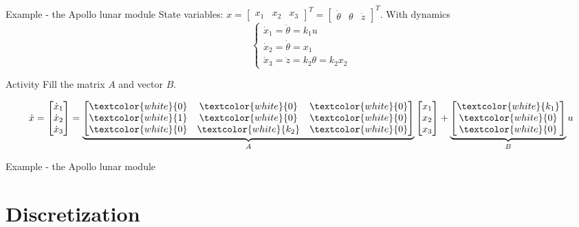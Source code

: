 \documentclass[presentation,aspectratio=1610]{beamer}
\begin{document}
\begin{frame}[label={sec:orgc66d921}]{Example - the Apollo lunar module}
State variables: \(x = \begin{bmatrix} x_1 & x_2 & x_3 \end{bmatrix}^T = \begin{bmatrix} \dot{\theta} & \theta & \dot{z} \end{bmatrix}^T\). With dynamics
\[ \begin{cases} \dot{x}_1 =  \ddot{\theta} = k_1 u\\ \dot{x}_2 = \dot{\theta} = x_1\\ \dot{x}_3 = \ddot{z} = k_2\theta = k_2x_2 \end{cases} \]

\alert{Activity} Fill the matrix \(A\) and vector \(B\).

\[ \dot{x} = \begin{bmatrix} \dot{x}_1\\\dot{x}_2\\\dot{x}_3\end{bmatrix} = \underbrace{\begin{bmatrix} \textcolor{white}{0} & \textcolor{white}{0} &\textcolor{white}{0} \\\textcolor{white}{1} & \textcolor{white}{0}& \textcolor{white}{0}\\ \textcolor{white}{0}& \textcolor{white}{k_2} &\textcolor{white}{0} \end{bmatrix}}_{A} \begin{bmatrix} x_1\\x_2\\x_3\end{bmatrix} + \underbrace{\begin{bmatrix} \textcolor{white}{k_1} \\ \textcolor{white}{0} \\\textcolor{white}{0}  \end{bmatrix}}_{B} u \]
\end{frame}

\begin{frame}[label={sec:org1f8222f}]{Example - the Apollo lunar module}
\end{frame}


\section{Discretization}
\label{sec:org5295fa1}
\end{document}
